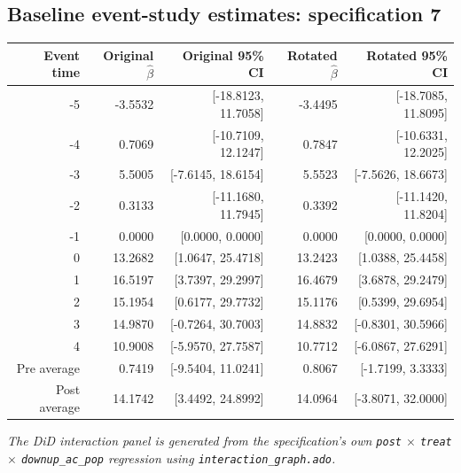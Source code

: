 \documentclass[10pt]{article}
\begin{document}
\subsection*{Baseline event-study estimates: specification 7}
\begin{center}
\scriptsize
\begin{tabular}{r rr rr}
\toprule
Event time & Original $\hat\beta$ & Original 95\% CI & Rotated $\hat\beta$ & Rotated 95\% CI \\
\midrule
-5 & -3.5532 & [-18.8123, 11.7058] & -3.4495 & [-18.7085, 11.8095] \\
-4 & 0.7069 & [-10.7109, 12.1247] & 0.7847 & [-10.6331, 12.2025] \\
-3 & 5.5005 & [-7.6145, 18.6154] & 5.5523 & [-7.5626, 18.6673] \\
-2 & 0.3133 & [-11.1680, 11.7945] & 0.3392 & [-11.1420, 11.8204] \\
-1 & 0.0000 & [0.0000, 0.0000] & 0.0000 & [0.0000, 0.0000] \\
0 & 13.2682 & [1.0647, 25.4718] & 13.2423 & [1.0388, 25.4458] \\
1 & 16.5197 & [3.7397, 29.2997] & 16.4679 & [3.6878, 29.2479] \\
2 & 15.1954 & [0.6177, 29.7732] & 15.1176 & [0.5399, 29.6954] \\
3 & 14.9870 & [-0.7264, 30.7003] & 14.8832 & [-0.8301, 30.5966] \\
4 & 10.9008 & [-5.9570, 27.7587] & 10.7712 & [-6.0867, 27.6291] \\
\midrule
Pre average & 0.7419 & [-9.5404, 11.0241] & 0.8067 & [-1.7199, 3.3333] \\
Post average & 14.1742 & [3.4492, 24.8992] & 14.0964 & [-3.8071, 32.0000] \\
\bottomrule
\end{tabular}
\end{center}
\medskip
\textit{The DiD interaction panel is generated from the specification's own \texttt{post} $\times$ \texttt{treat} $\times$ \texttt{downup\_ac\_pop} regression using \texttt{interaction\_graph.ado}.}
\clearpage
\end{document}
